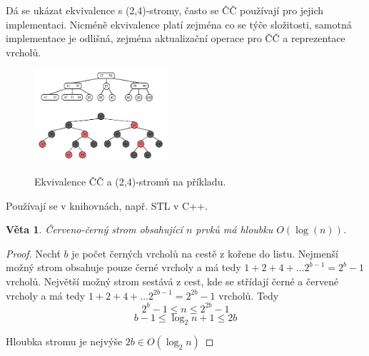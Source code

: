 \documentclass[11pt]{report} %
\newtheorem{theorem}{Věta}[section]
\numberwithin{equation}{section}
\begin{document}
Dá se ukázat ekvivalence s (2,4)-stromy, často se ČČ používají pro jejich implementaci. Nicméně ekvivalence platí zejména co se týče složitosti, samotná implementace je odlišná, zejména aktualizační operace pro ČČ a reprezentace vrcholů.
\begin{figure}[H]
	\centering
	\includegraphics[width=0.44\textwidth]{img/rbtree_24tree.jpg}
	\label{rb24}
	\caption{Ekvivalence ČČ a (2,4)-stromů na příkladu.}
\end{figure}

Používají se v knihovnách, např. STL v C++.

\begin{theorem}
	Červeno-černý strom obsahující $n$ prvků má hloubku $O(\log (n))$.
\end{theorem}
\begin{proof}
	Nechť $b$ je počet černých vrcholů na cestě z kořene do listu. Nejmenší možný strom obsahuje pouze černé vrcholy a má tedy $1 + 2 + 4 + \dots 2^{b-1} = 2^{b} - 1$ vrcholů. Největší možný strom sestává z cest, kde se střídají černé a červené vrcholy a má tedy $1 + 2 + 4 + \dots 2^{2b-1} = 2^{2b} - 1$ vrcholů. Tedy
	$$2^b - 1 \leq n \leq 2^{2b} -1$$
	$$b - 1 \leq \log_2 n + 1\leq 2b$$
	
	Hloubka stromu je nejvýše $2b \in O(\log_2 n)$
\end{proof}
\end{document}
